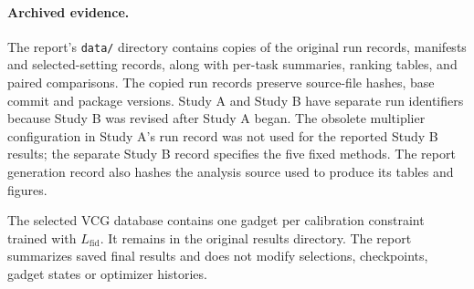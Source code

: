 \paragraph{Archived evidence.}
The report's \texttt{data/} directory contains copies of the original run records, manifests and selected-setting records, along with per-task summaries, ranking tables, and paired comparisons. The copied run records preserve source-file hashes, base commit and package versions. Study A and Study B have separate run identifiers because Study B was revised after Study A began. The obsolete multiplier configuration in Study A's run record was not used for the reported Study B results; the separate Study B record specifies the five fixed methods. The report generation record also hashes the analysis source used to produce its tables and figures.

The selected VCG database contains one gadget per calibration constraint trained with $L_{\mathrm{fid}}$. It remains in the original results directory. The report summarizes saved final results and does not modify selections, checkpoints, gadget states or optimizer histories.

